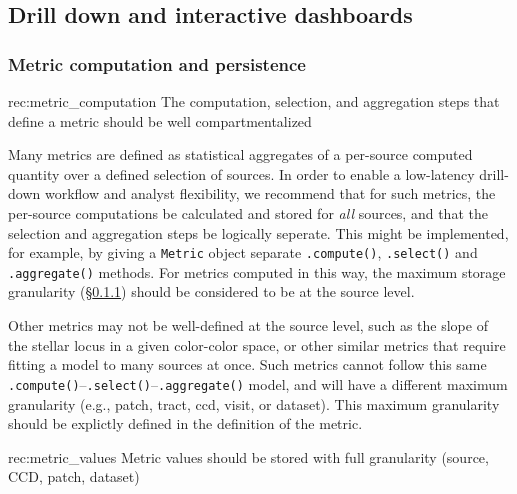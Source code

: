 
\subsection{Drill down and interactive dashboards} \label{sec:drill-down-design}

\subsubsection{Metric computation and persistence} \label{sec:metric_storage}

\begin{recommendation}
    {rec:metric_computation}
    {The computation, selection, and aggregation steps that define a metric should be well compartmentalized}
\end{recommendation}

Many metrics are defined as statistical aggregates of a per-source computed quantity over a defined selection of sources.
In order to enable a low-latency drill-down workflow and analyst flexibility, we recommend that for such metrics, the per-source computations be calculated and stored for \emph{all} sources, and that the selection and aggregation steps be logically seperate.
This might be implemented, for example, by giving a \texttt{Metric} object separate \texttt{.compute()}, \texttt{.select()} and \texttt{.aggregate()} methods.
For metrics computed in this way, the maximum storage granularity (\S \ref{sec:metric_storage}) should be considered to be at the source level.

Other metrics may not be well-defined at the source level, such as the slope of the stellar locus in a given color-color space, or other similar metrics that require fitting a model to many sources at once.
Such metrics cannot follow this same \texttt{.compute()}--\texttt{.select()}--\texttt{.aggregate()} model, and will have a different maximum granularity (e.g., patch, tract, ccd, visit, or dataset).
This maximum granularity should be explictly defined in the definition of the metric.

\begin{recommendation}
    {rec:metric_values}
    {Metric values should be stored with full granularity (source, CCD, patch, dataset)}
\end{recommendation}

